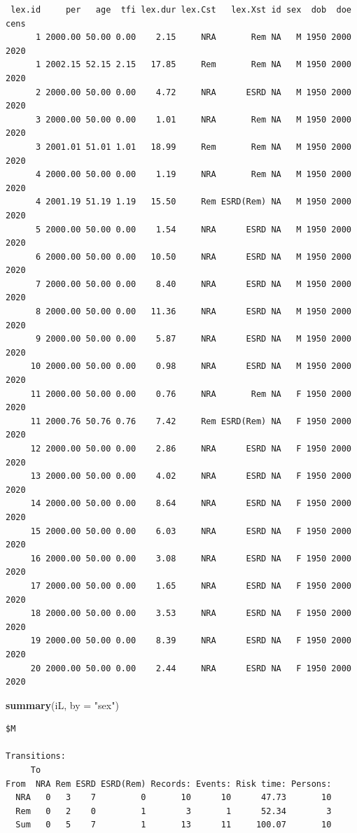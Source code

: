 \documentclass[
]{book}
\newenvironment{Shaded}{\begin{snugshade}}{\end{snugshade}}
\newcommand{\AttributeTok}[1]{\textcolor[rgb]{0.13,0.29,0.53}{#1}}
\newcommand{\FunctionTok}[1]{\textcolor[rgb]{0.13,0.29,0.53}{\textbf{#1}}}
\newcommand{\NormalTok}[1]{#1}
\newcommand{\StringTok}[1]{\textcolor[rgb]{0.31,0.60,0.02}{#1}}
\theoremstyle{definition}
\theoremstyle{definition}
\theoremstyle{definition}
\theoremstyle{definition}
\theoremstyle{remark}
\begin{document}
\begin{enumerate}
\begin{verbatim}
 lex.id     per   age  tfi lex.dur lex.Cst   lex.Xst id sex  dob  doe cens
      1 2000.00 50.00 0.00    2.15     NRA       Rem NA   M 1950 2000 2020
      1 2002.15 52.15 2.15   17.85     Rem       Rem NA   M 1950 2000 2020
      2 2000.00 50.00 0.00    4.72     NRA      ESRD NA   M 1950 2000 2020
      3 2000.00 50.00 0.00    1.01     NRA       Rem NA   M 1950 2000 2020
      3 2001.01 51.01 1.01   18.99     Rem       Rem NA   M 1950 2000 2020
      4 2000.00 50.00 0.00    1.19     NRA       Rem NA   M 1950 2000 2020
      4 2001.19 51.19 1.19   15.50     Rem ESRD(Rem) NA   M 1950 2000 2020
      5 2000.00 50.00 0.00    1.54     NRA      ESRD NA   M 1950 2000 2020
      6 2000.00 50.00 0.00   10.50     NRA      ESRD NA   M 1950 2000 2020
      7 2000.00 50.00 0.00    8.40     NRA      ESRD NA   M 1950 2000 2020
      8 2000.00 50.00 0.00   11.36     NRA      ESRD NA   M 1950 2000 2020
      9 2000.00 50.00 0.00    5.87     NRA      ESRD NA   M 1950 2000 2020
     10 2000.00 50.00 0.00    0.98     NRA      ESRD NA   M 1950 2000 2020
     11 2000.00 50.00 0.00    0.76     NRA       Rem NA   F 1950 2000 2020
     11 2000.76 50.76 0.76    7.42     Rem ESRD(Rem) NA   F 1950 2000 2020
     12 2000.00 50.00 0.00    2.86     NRA      ESRD NA   F 1950 2000 2020
     13 2000.00 50.00 0.00    4.02     NRA      ESRD NA   F 1950 2000 2020
     14 2000.00 50.00 0.00    8.64     NRA      ESRD NA   F 1950 2000 2020
     15 2000.00 50.00 0.00    6.03     NRA      ESRD NA   F 1950 2000 2020
     16 2000.00 50.00 0.00    3.08     NRA      ESRD NA   F 1950 2000 2020
     17 2000.00 50.00 0.00    1.65     NRA      ESRD NA   F 1950 2000 2020
     18 2000.00 50.00 0.00    3.53     NRA      ESRD NA   F 1950 2000 2020
     19 2000.00 50.00 0.00    8.39     NRA      ESRD NA   F 1950 2000 2020
     20 2000.00 50.00 0.00    2.44     NRA      ESRD NA   F 1950 2000 2020
\end{verbatim}

\begin{Shaded}
\begin{Highlighting}[]
\FunctionTok{summary}\NormalTok{(iL, }\AttributeTok{by =} \StringTok{"sex"}\NormalTok{)}
\end{Highlighting}
\end{Shaded}

\begin{verbatim}
$M

Transitions:
     To
From  NRA Rem ESRD ESRD(Rem) Records: Events: Risk time: Persons:
  NRA   0   3    7         0       10      10      47.73       10
  Rem   0   2    0         1        3       1      52.34        3
  Sum   0   5    7         1       13      11     100.07       10


\end{verbatim}
\end{enumerate}
\end{document}
